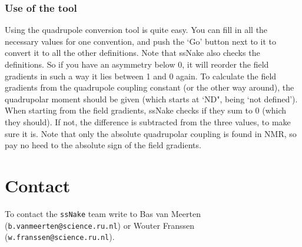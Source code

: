 \documentclass[11pt,a4paper]{article}
\begin{document}
\subsubsection*{Use of the tool}
Using the quadrupole conversion tool is quite easy. You can fill in all the necessary values for one convention, and push the `Go' button next to it to convert it to all the other definitions. Note that ssNake also checks the definitions. So if you have an asymmetry below 0, it will reorder the field gradients in such a way it lies between 1 and 0 again. To calculate the field gradients from the quadrupole coupling constant (or the other way around), the quadrupolar moment should be given (which starts at `ND", being `not defined'). When starting from the field gradients, ssNake checks if they sum to 0 (which they should). If not, the difference is subtracted from the three values, to make sure it is. Note that only the absolute quadrupolar coupling is found in NMR, so pay no heed to the absolute sign of the field gradients.

\section{Contact}
To contact the \texttt{ssNake} team write to Bas van Meerten (\texttt{b.vanmeerten@science.ru.nl}) or Wouter Franssen (\texttt{w.franssen@science.ru.nl}).



\end{document}
